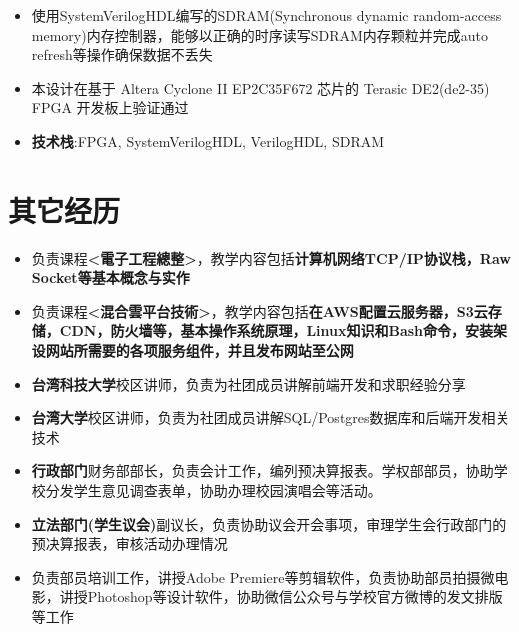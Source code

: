\documentclass{resume}
\begin{document}
        \begin{itemize}
            \item 使用SystemVerilogHDL编写的SDRAM(Synchronous dynamic random-access memory)内存控制器，能够以正确的时序读写SDRAM内存颗粒并完成auto refresh等操作确保数据不丢失
            \item 本设计在基于 Altera Cyclone II EP2C35F672 芯片的 Terasic DE2(de2-35) FPGA 开发板上验证通过
            \item \textbf{技术栈}:FPGA, SystemVerilogHDL, VerilogHDL, SDRAM
        \end{itemize}

\section{ 其它经历}
        \begin{itemize}
            \item 负责课程\textbf{<電子工程總整>}，教学内容包括\textbf{计算机网络TCP/IP协议栈，Raw Socket等基本概念与实作}
            \item 负责课程\textbf{<混合雲平台技術>}，教学内容包括\textbf{在AWS配置云服务器，S3云存储，CDN，防火墙等，基本操作系统原理，Linux知识和Bash命令，安装架设网站所需要的各项服务组件，并且发布网站至公网}
        \end{itemize}
        \begin{itemize}
            \item \textbf{台湾科技大学}校区讲师，负责为社团成员讲解前端开发和求职经验分享
            \item \textbf{台湾大学}校区讲师，负责为社团成员讲解SQL/Postgres数据库和后端开发相关技术
        \end{itemize}
        \begin{itemize}
            \item \textbf{行政部门}财务部部长，负责会计工作，编列预决算报表。学权部部员，协助学校分发学生意见调查表单，协助办理校园演唱会等活动。
            \item \textbf{立法部门(学生议会)}副议长，负责协助议会开会事项，审理学生会行政部门的预决算报表，审核活动办理情况
        \end{itemize}
        \begin{itemize}
            \item 负责部员培训工作，讲授Adobe Premiere等剪辑软件，负责协助部员拍摄微电影，讲授Photoshop等设计软件，协助微信公众号与学校官方微博的发文排版等工作
        \end{itemize}
\end{document}
